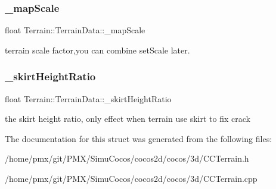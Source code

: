 \subsubsection{\texorpdfstring{\+\_\+map\+Scale}{\_mapScale}}
{\footnotesize\ttfamily float Terrain\+::\+Terrain\+Data\+::\+\_\+map\+Scale}

terrain scale factor,you can combine set\+Scale later. \mbox{\label{structTerrain_1_1TerrainData_ae0d8e147b63dacce35e10596750b458f}} 
\subsubsection{\texorpdfstring{\+\_\+skirt\+Height\+Ratio}{\_skirtHeightRatio}}
{\footnotesize\ttfamily float Terrain\+::\+Terrain\+Data\+::\+\_\+skirt\+Height\+Ratio}

the skirt height ratio, only effect when terrain use skirt to fix crack 

The documentation for this struct was generated from the following files\+:\begin{DoxyCompactItemize}
\item 
/home/pmx/git/\+P\+M\+X/\+Simu\+Cocos/cocos2d/cocos/3d/C\+C\+Terrain.\+h\item 
/home/pmx/git/\+P\+M\+X/\+Simu\+Cocos/cocos2d/cocos/3d/C\+C\+Terrain.\+cpp\end{DoxyCompactItemize}
